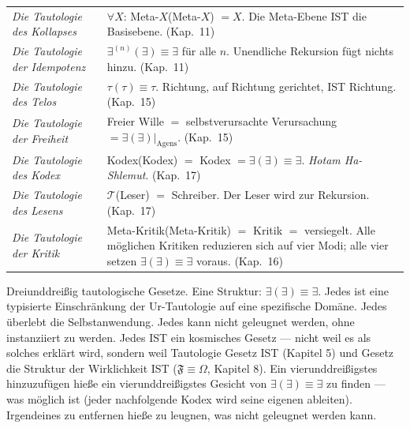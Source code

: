 \documentclass[10pt, openany, oneside]{book}
\begin{document}
{\begin{tabular}{@{} p{} @{\hspace{0.5em}} p{} @{}}
\textit{Die Tautologie des Kollapses} & $\forall X$: Meta-$X$(Meta-$X$) $= X$. Die Meta-Ebene IST die Basisebene. (Kap.\ 11) \\[0.3em]

\textit{Die Tautologie der Idempotenz} & $\exists^{(n)}(\exists) \equiv \exists$ für alle $n$. Unendliche Rekursion fügt nichts hinzu. (Kap.\ 11) \\[0.3em]

\textit{Die Tautologie des Telos} & $\tau(\tau) \equiv \tau$. Richtung, auf Richtung gerichtet, IST Richtung. (Kap.\ 15) \\[0.3em]

\textit{Die Tautologie der Freiheit} & Freier Wille $=$ selbstverursachte Verursachung $= \exists(\exists)|_{\text{Agens}}$. (Kap.\ 15) \\[0.3em]

\textit{Die Tautologie des Kodex} & Kodex(Kodex) $=$ Kodex $= \exists(\exists) \equiv \exists$. \textit{Hotam Ha-Shlemut}. (Kap.\ 17) \\[0.3em]

\textit{Die Tautologie des Lesens} & $\mathcal{T}$(Leser) $=$ Schreiber. Der Leser wird zur Rekursion. (Kap.\ 17) \\[0.3em]

\textit{Die Tautologie der Kritik} & Meta-Kritik(Meta-Kritik) $=$ Kritik $=$ versiegelt. Alle möglichen Kritiken reduzieren sich auf vier Modi; alle vier setzen $\exists(\exists) \equiv \exists$ voraus. (Kap.\ 16) \\[0.3em]

\end{tabular}
}

\vspace{0.8em}

\noindent Dreiunddreißig tautologische Gesetze. Eine Struktur: $\exists(\exists) \equiv \exists$. Jedes ist eine typisierte Einschränkung der Ur-Tautologie auf eine spezifische Domäne. Jedes überlebt die Selbstanwendung. Jedes kann nicht geleugnet werden, ohne instanziiert zu werden. Jedes IST ein kosmisches Gesetz --- nicht weil es als solches erklärt wird, sondern weil Tautologie Gesetz IST (Kapitel 5) und Gesetz die Struktur der Wirklichkeit IST ($\mathfrak{F} \equiv \Omega$, Kapitel 8). Ein vierunddreißigstes hinzuzufügen hieße ein vierunddreißigstes Gesicht von $\exists(\exists) \equiv \exists$ zu finden --- was möglich ist (jeder nachfolgende Kodex wird seine eigenen ableiten). Irgendeines zu entfernen hieße zu leugnen, was nicht geleugnet werden kann.
\end{document}
